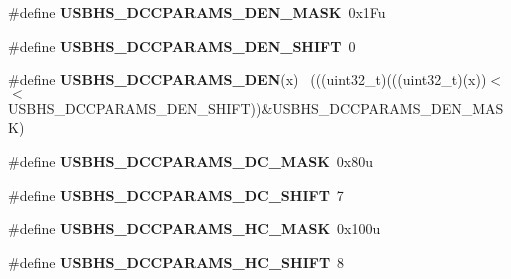 \begin{DoxyCompactItemize}
\item 
\hypertarget{group___u_s_b_h_s___register___masks_ga450453b38b8ef3c7320862d64b88150c}{}\#define {\bfseries U\+S\+B\+H\+S\+\_\+\+D\+C\+C\+P\+A\+R\+A\+M\+S\+\_\+\+D\+E\+N\+\_\+\+M\+A\+S\+K}~0x1\+Fu\label{group___u_s_b_h_s___register___masks_ga450453b38b8ef3c7320862d64b88150c}

\item 
\hypertarget{group___u_s_b_h_s___register___masks_ga5a6f4a0ef2af1938ccfd57809f181bac}{}\#define {\bfseries U\+S\+B\+H\+S\+\_\+\+D\+C\+C\+P\+A\+R\+A\+M\+S\+\_\+\+D\+E\+N\+\_\+\+S\+H\+I\+F\+T}~0\label{group___u_s_b_h_s___register___masks_ga5a6f4a0ef2af1938ccfd57809f181bac}

\item 
\hypertarget{group___u_s_b_h_s___register___masks_gaa390e7b74983a36e52682ce8ecd44528}{}\#define {\bfseries U\+S\+B\+H\+S\+\_\+\+D\+C\+C\+P\+A\+R\+A\+M\+S\+\_\+\+D\+E\+N}(x)                                  ~(((uint32\+\_\+t)(((uint32\+\_\+t)(x))$<$$<$U\+S\+B\+H\+S\+\_\+\+D\+C\+C\+P\+A\+R\+A\+M\+S\+\_\+\+D\+E\+N\+\_\+\+S\+H\+I\+F\+T))\&U\+S\+B\+H\+S\+\_\+\+D\+C\+C\+P\+A\+R\+A\+M\+S\+\_\+\+D\+E\+N\+\_\+\+M\+A\+S\+K)\label{group___u_s_b_h_s___register___masks_gaa390e7b74983a36e52682ce8ecd44528}

\item 
\hypertarget{group___u_s_b_h_s___register___masks_gab7987f36d1e32d60293eaf6f7221eabf}{}\#define {\bfseries U\+S\+B\+H\+S\+\_\+\+D\+C\+C\+P\+A\+R\+A\+M\+S\+\_\+\+D\+C\+\_\+\+M\+A\+S\+K}~0x80u\label{group___u_s_b_h_s___register___masks_gab7987f36d1e32d60293eaf6f7221eabf}

\item 
\hypertarget{group___u_s_b_h_s___register___masks_ga54071b475e2175f8595a985fa0cb68cf}{}\#define {\bfseries U\+S\+B\+H\+S\+\_\+\+D\+C\+C\+P\+A\+R\+A\+M\+S\+\_\+\+D\+C\+\_\+\+S\+H\+I\+F\+T}~7\label{group___u_s_b_h_s___register___masks_ga54071b475e2175f8595a985fa0cb68cf}

\item 
\hypertarget{group___u_s_b_h_s___register___masks_gae98b70c69f93808113b1c71105ff4321}{}\#define {\bfseries U\+S\+B\+H\+S\+\_\+\+D\+C\+C\+P\+A\+R\+A\+M\+S\+\_\+\+H\+C\+\_\+\+M\+A\+S\+K}~0x100u\label{group___u_s_b_h_s___register___masks_gae98b70c69f93808113b1c71105ff4321}

\item 
\hypertarget{group___u_s_b_h_s___register___masks_ga6282dd8206d96038d223586dc0d5c661}{}\#define {\bfseries U\+S\+B\+H\+S\+\_\+\+D\+C\+C\+P\+A\+R\+A\+M\+S\+\_\+\+H\+C\+\_\+\+S\+H\+I\+F\+T}~8\label{group___u_s_b_h_s___register___masks_ga6282dd8206d96038d223586dc0d5c661}


\end{DoxyCompactItemize}
